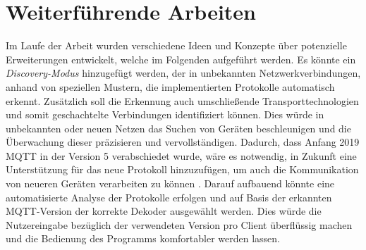 \section{Weiterführende Arbeiten}
Im Laufe der Arbeit wurden verschiedene Ideen und Konzepte über potenzielle Erweiterungen entwickelt, welche im Folgenden aufgeführt werden.
Es könnte ein \emph{Discovery-Modus} hinzugefügt werden, der in unbekannten Netzwerkverbindungen, anhand von speziellen Mustern, die implementierten Protokolle automatisch erkennt. Zusätzlich soll die Erkennung auch umschließende Transporttechnologien und somit geschachtelte Verbindungen identifiziert können. Dies würde in unbekannten oder neuen Netzen das Suchen von Geräten beschleunigen und die Überwachung dieser präzisieren und vervollständigen.
Dadurch, dass Anfang 2019 MQTT in der Version 5 verabschiedet wurde, wäre es notwendig, in Zukunft eine Unterstützung für das neue Protokoll hinzuzufügen, um auch die Kommunikation von neueren Geräten verarbeiten zu können \cite{mqtt_org_2019}.
Darauf aufbauend könnte eine automatisierte Analyse der Protokolle erfolgen und auf Basis der erkannten \ac{MQTT}-Version der korrekte Dekoder ausgewählt werden. Dies würde die Nutzereingabe bezüglich der verwendeten Version pro Client überflüssig machen und die Bedienung des Programms komfortabler werden lassen.
